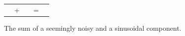 \begin{figure}
\begin{tabularx}{\textwidth}{XcXcX}
\noindent\parbox[c]{\hsize}{\includegraphics[width=0.75\linewidth]{bolt/comp_all78.eps}}  &+&  \noindent\parbox[c]{\hsize}{\includegraphics[width=0.75\linewidth]{bolt/comp_all5.eps}}   &=&  \noindent\parbox[c]{\hsize}{\includegraphics[width=0.75\linewidth]{bolt/sum70_5.eps}}
\end{tabularx}
\caption[BOLT: The sum of a seemingly noisy and a sinusoidal component.]{The sum of a seemingly noisy and a sinusoidal component.}
\label{fg:wv_sum}
\end{figure}

